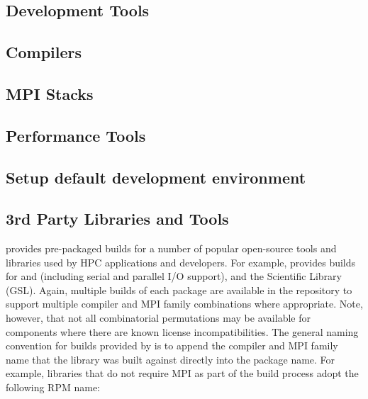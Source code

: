 \documentclass[letterpaper]{article}
\begin{document}
\subsection{Development Tools} \label{sec:install_dev_tools}


\subsection{Compilers} \label{sec:install_compilers}


\subsection{MPI Stacks} \label{sec:mpi}


\subsection{Performance Tools} \label{sec:install_perf_tools}


\subsection{Setup default development environment}


\subsection{3rd Party Libraries and Tools} \label{sec:3rdparty}

\OHPC{} provides pre-packaged builds for a number of popular open-source
tools and libraries used by HPC applications and developers. For
example, \OHPC{} provides builds for \FFTW{} and \hdffive{} (including serial and parallel
I/O support), and the \GNU{} Scientific Library (GSL). Again, multiple builds of
each package are available in the \OHPC{} repository to support multiple compiler
and MPI family combinations where appropriate. Note, however, that not all
combinatorial permutations may be available for components where there are known
license incompatibilities. The general naming convention
for builds provided by \OHPC{} is to append the compiler and MPI family name that
the library was built against directly into the package name. For example,
libraries that do not require MPI as part of the build process adopt the
following RPM name: \\
\end{document}
